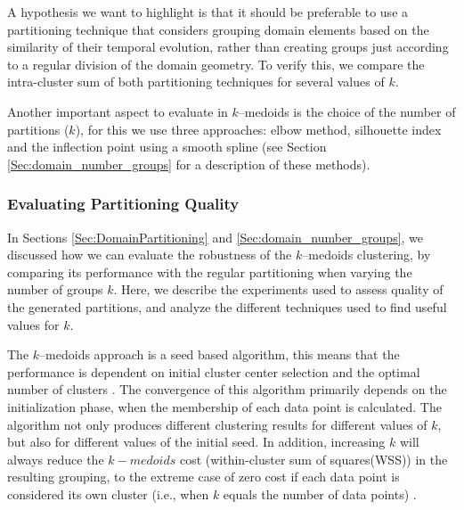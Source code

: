 A hypothesis we want to highlight is that it should be preferable to use a partitioning technique that considers grouping domain elements based on the similarity of their temporal evolution, rather than creating groups just according to a regular division of the domain geometry. To verify this, we compare the intra-cluster sum of both partitioning techniques for several values of $k$.

Another important aspect to evaluate in $k$--medoids is the choice of the number of partitions ($k$), for this we use three approaches: elbow method, silhouette index and the inflection point using a smooth spline (see Section \ref{Sec:domain_number_groups} for a description of these methods).

\subsubsection{Evaluating Partitioning Quality}
\label{Sec:EvaluatingPP}

In Sections \ref{Sec:DomainPartitioning} and \ref{Sec:domain_number_groups}, we discussed how we can evaluate the robustness of the $k$--medoids clustering, by comparing its performance with the regular partitioning when varying the number of groups $k$. Here, we describe the experiments used to assess quality of the generated partitions, and analyze the different techniques used to find useful values for $k$.  

The $k$--medoids approach is a seed based algorithm, this means that the performance is dependent on initial cluster center selection and the optimal number of clusters \cite{Chowdhury2019}. The convergence of this algorithm primarily depends on the initialization phase, when the membership of each data point is calculated. The algorithm not only produces different clustering results for different values of $k$, but also for different values of the initial seed. In addition, increasing $k$ will always reduce the $k-medoids$ cost (within-cluster sum of squares(WSS)) in the resulting grouping, to the extreme case of zero cost if each data point is considered its own cluster (i.e., when $k$ equals the number of data points) \cite{HastieTF2009}. 

